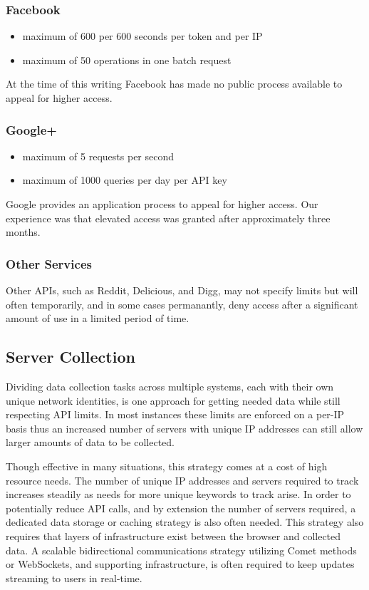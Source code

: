 \documentclass[letterpaper]{article}
\begin{document}
\subsubsection{Facebook} 
\begin{itemize}
\item maximum of 600 per 600 seconds per token and per IP
\item maximum of 50 operations in one batch request
\end{itemize}
At the time of this writing Facebook has made no public process available to appeal for higher access.

\subsubsection{Google+}
\begin{itemize}
\item maximum of 5 requests per second
\item maximum of 1000 queries per day per API key
\end{itemize}
Google provides an application process to appeal for higher access. Our experience was that elevated access was granted after approximately three months.

\subsubsection{Other Services}

Other APIs, such as Reddit, Delicious, and Digg, may not specify limits but will often temporarily, and in some cases permanantly, deny access after a significant amount of use in a limited period of time.

\subsection{Server Collection}

Dividing data collection tasks across multiple systems, each with their own unique network identities, is one approach for getting needed data while still respecting API limits. In most instances these limits are enforced on a per-IP basis thus an increased number of servers with unique IP addresses can still allow larger amounts of data to be collected.

Though effective in many situations, this strategy comes at a cost of high resource needs. The number of unique IP addresses and servers required to track increases steadily as needs for more unique keywords to track arise. In order to potentially reduce API calls, and by extension the number of servers required, a dedicated data storage or caching strategy is also often needed. This strategy also requires that layers of infrastructure exist between the browser and collected data. A scalable bidirectional communications strategy utilizing Comet methods or WebSockets, and supporting infrastructure, is often required to keep updates streaming to users in real-time.
\end{document}
